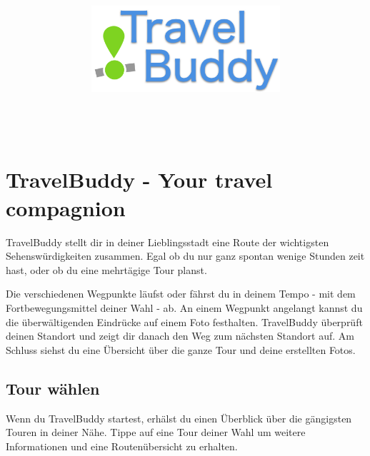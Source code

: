 \documentclass[a4paper,10pt,xetex]{article}
\title{
  \includegraphics[width=7cm]{travel-buddy_white}\\[\bigskipamount]
  \documenttitle\\[\bigskipamount]
}
\author{\documentauthors}
\date{\parbox{\linewidth}{\centering%
  IT15TA ZH \hspace*{3cm} Gruppe 3\endgraf\bigskip
  Dokumentversion \documentversion, \documentdate\endgraf
}}
\begin{document}
\maketitle\newpage

%

\section{TravelBuddy - Your travel compagnion}

TravelBuddy stellt dir in deiner Lieblingsstadt eine Route der wichtigsten Sehenswürdigkeiten
zusammen. Egal ob du nur ganz spontan wenige Stunden zeit hast, oder ob du eine mehrtägige
Tour planst.

Die verschiedenen Wegpunkte läufst oder fährst du in deinem Tempo - mit dem Fortbewegungsmittel
deiner Wahl - ab. An einem Wegpunkt angelangt kannst du die überwältigenden Eindrücke auf
einem Foto festhalten. TravelBuddy überprüft deinen Standort und zeigt dir danach den Weg
zum nächsten Standort auf. Am Schluss siehst du eine Übersicht über die ganze Tour und
deine erstellten Fotos.

\subsection{Tour wählen}
Wenn du TravelBuddy startest, erhälst du einen Überblick über die gängigsten Touren in
deiner Nähe. Tippe auf eine Tour deiner Wahl um weitere Informationen und eine
Routenübersicht zu erhalten.
\end{document}
